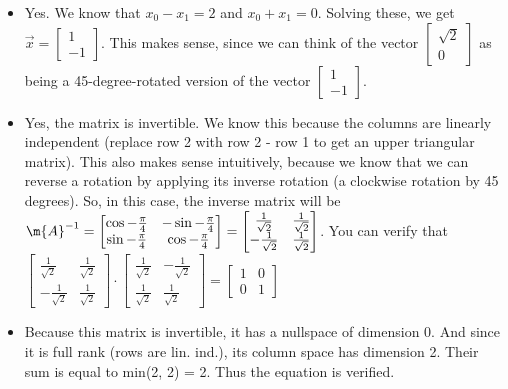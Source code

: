 \begin{enumerate}
{\begin{itemize}
        \item Yes. We know that $x_0 - x_1 = 2$ and $x_0 + x_1 = 0$. Solving these, we get $\vec{x} = \begin{bmatrix}1 \\ -1\end{bmatrix}$. This makes sense, since we can think of the vector $\begin{bmatrix}\sqrt{2} \\ 0\end{bmatrix}$ as being a 45-degree-rotated version of the vector $\begin{bmatrix}1 \\ -1\end{bmatrix}$.
        \item Yes, the matrix is invertible. We know this because the columns are linearly independent (replace row 2 with row 2 - row 1 to get an upper triangular matrix). This also makes sense intuitively, because we know that we can reverse a rotation by applying its inverse rotation (a clockwise rotation by 45 degrees). So, in this case, the inverse matrix will be
        $\m{A}^{-1} = \begin{bmatrix}
            \cos{-\frac{\pi}{4}} & -\sin{-\frac{\pi}{4}} \\
            \sin{-\frac{\pi}{4}} & \cos{-\frac{\pi}{4}}
        \end{bmatrix}
         = \begin{bmatrix}
            \frac{1}{\sqrt{2}} & \frac{1}{\sqrt{2}} \\
            -\frac{1}{\sqrt{2}} & \frac{1}{\sqrt{2}}
        \end{bmatrix}$.
        You can verify that $\begin{bmatrix}
            \frac{1}{\sqrt{2}} & \frac{1}{\sqrt{2}} \\
            -\frac{1}{\sqrt{2}} & \frac{1}{\sqrt{2}}
        \end{bmatrix}
        \cdot \begin{bmatrix}
            \frac{1}{\sqrt{2}} & -\frac{1}{\sqrt{2}} \\
            \frac{1}{\sqrt{2}} & \frac{1}{\sqrt{2}}
        \end{bmatrix}
        = \begin{bmatrix}
            1 & 0 \\
            0 & 1
        \end{bmatrix}$
        \item Because this matrix is invertible, it has a nullspace of dimension 0. And since it is full rank (rows are lin. ind.), its column space has dimension 2. Their sum is equal to min(2, 2) = 2. Thus the equation is verified.
    \end{itemize}
}


\end{enumerate}
